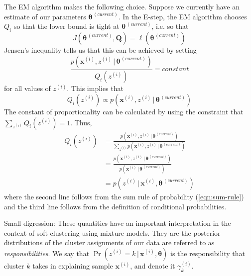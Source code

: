 \documentclass[final,3p,times,twocolumn]{elsarticle}
\let\bs\boldsymbol
\begin{document}
The EM algorithm makes the following choice.
Suppose we currently have an estimate of our parameters $\bs\theta^{\,(current)}$. 
In the E-step, the EM algorithm chooses $Q_i$ so that the lower bound is tight at $\bs\theta^{\,(current)}$, i.e. so that
\begin{equation}
J\left(\bs\theta^{\,(current)},\bs Q\right) = \ell\left(\bs\theta^{\,(current)}\right)
\end{equation}
Jensen's inequality tells us that this can be achieved by setting 
\begin{equation}
\frac{p(\bs x^{(i)},z^{(i)}\,|\,\bs \theta^{\,(current)})}{Q_i(z^{(i)})} = constant
\end{equation}
for all values of $z^{(i)}$.
This implies that
\begin{equation}
Q_i(z^{(i)}) \propto p(\bs x^{(i)},z^{(i)}\,|\,\bs\theta^{\,(current)})
\end{equation}
The constant of proportionality can be calculated by using the constraint that $\sum_{z^{(i)}} Q_i(z^{(i)}) = 1$.
Thus,
\begin{equation}
\label{eqn:EM-E}
\begin{split}
Q_i(z^{(i)}) &= \frac{p(\bs x^{(i)},z^{(i)}\,|\,\bs\theta^{\,(current)})}{\sum_{z^{(i)}}p(\bs x^{(i)},z^{(i)}\,|\,\bs\theta^{\,(current)})}\\
&= \frac{p(\bs x^{(i)},z^{(i)}\,|\,\bs\theta^{\,(current)})}{p(\bs x^{(i)}\,|\,\bs\theta^{\,(current)})}\\
&= p(z^{(i)}\,|\,\bs x^{(i)},\bs\theta^{\,(current)})
\end{split}
\end{equation}
where the second line follows from the sum rule of probability (\ref{eqn:sum-rule}) and the third line follows from the definition of conditional probabilities.

Small digression: These quantities have an important interpretation in the context of soft clustering using mixture models.
They are the posterior distributions of the cluster assignments of our data are referred to as \emph{responsibilities}.
We say that $\Pr(z^{(i)} = k\,|\,\bs x^{(i)},\bs\theta)$ is the responsibility that cluster $k$ takes in explaining sample $\bs x^{(i)}$, and denote it $\gamma_k^{(i)}$.
\end{document}
